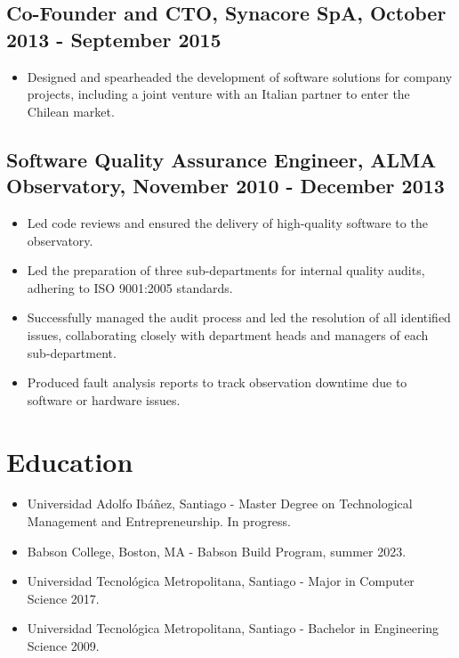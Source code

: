 \documentclass[a4paper,10pt]{article}
\begin{document}
\subsection*{Co-Founder and CTO, Synacore SpA, October 2013 - September 2015}
\begin{itemize}[leftmargin=*,itemsep=0pt]
  \item Designed and spearheaded the development of software solutions for company projects, including a joint venture with an Italian partner to enter the Chilean market.
\end{itemize}

\subsection*{Software Quality Assurance Engineer, ALMA Observatory, November 2010 - December 2013}
\begin{itemize}[leftmargin=*,itemsep=0pt]
  \item Led code reviews and ensured the delivery of high-quality software to the observatory.
  \item Led the preparation of three sub-departments for internal quality audits, adhering to ISO 9001:2005 standards.
  \item Successfully managed the audit process and led the resolution of all identified issues, collaborating closely with department heads and managers of each sub-department.
  \item Produced fault analysis reports to track observation downtime due to software or hardware issues.
\end{itemize}

\section*{Education}
\begin{itemize}[leftmargin=*,itemsep=0pt]
  \item Universidad Adolfo Ibáñez, Santiago - Master Degree on Technological Management and Entrepreneurship. In progress.
  \item Babson College, Boston, MA - Babson Build Program, summer 2023.
  \item Universidad Tecnológica Metropolitana, Santiago - Major in Computer Science 2017.
  \item Universidad Tecnológica Metropolitana, Santiago - Bachelor in Engineering Science 2009.
\end{itemize}
\end{document}
